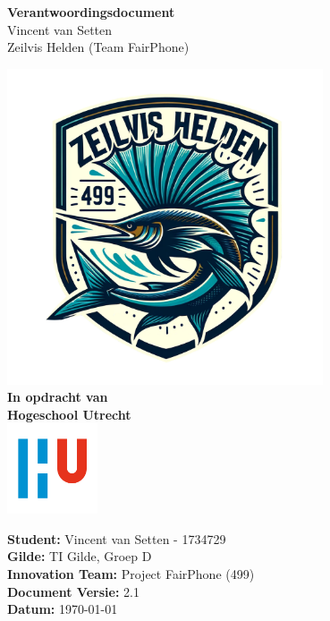 \documentclass[a4paper]{report}
\newcommand{\latestVersion}{2.1}
\begin{document}
\begin{titlepage}
  \begin{center}
      \vspace*{.6cm}
      \Huge
      \textbf{ Verantwoordingsdocument }\\
      \vspace{0.2cm}
      \small Vincent van Setten \\
      \small Zeilvis Helden (Team FairPhone)

      \normalsize


      \vspace{1cm}
      \includegraphics[width=0.7\textwidth]{Images/zeilvis_helden.png}
      \vspace{1cm}
      \Large\\
      \textbf{In opdracht van}\\
      \large
      \textbf{Hogeschool Utrecht} \\
      \includegraphics[width=0.2\textwidth]{Images/logouni.png}


      \vfill
    \end{center}
      \textbf{Student:} Vincent van Setten - 1734729 \\
      \textbf{Gilde:} TI Gilde, Groep D\\
      \textbf{Innovation Team:} Project FairPhone (499) \\
      \textbf{Document Versie:} \latestVersion \\
      \textbf{Datum:} \today \\
      \vspace{2cm}
\end{titlepage}
\end{document}
